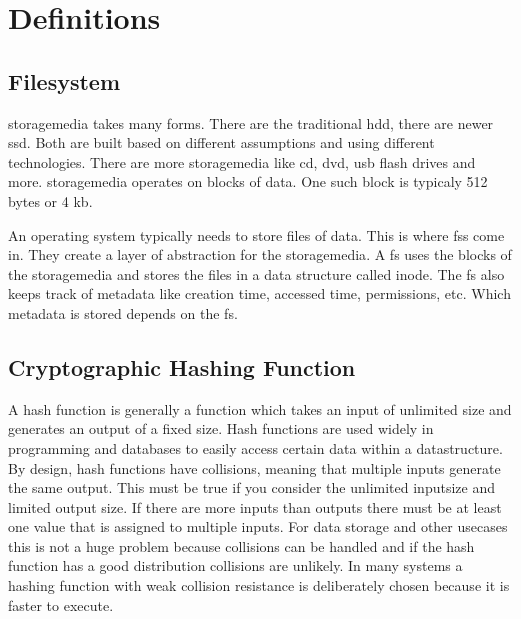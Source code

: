 \documentclass[
	a4paper,					%
	10pt,							%
	twoside,					%
	openright,				%
	notitlepage,			%
	parskip=half,			%
]{scrreprt}					%
\begin{document}
\section{Definitions}

\subsection{Filesystem}
\label{sec:fs}

\gls{storagemedia} takes many forms. There are the traditional \gls{hdd}, there are newer \gls{ssd}. Both are built based on different assumptions and using different technologies. There are more \gls{storagemedia} like \gls{cd}, \gls{dvd}, \gls{usb} flash drives and more. \gls{storagemedia} operates on blocks of data. One such block is typicaly 512 bytes or 4 \gls{kb}. \cite{bruce:imaging}

An operating system typically needs to store files of data. This is where \glspl{fs} come in. They create a layer of abstraction for the \gls{storagemedia}. A \gls{fs} uses the blocks of the \gls{storagemedia} and stores the files in a data structure called inode. \cite{inode} The \gls{fs} also keeps track of \gls{metadata} like creation time, accessed time, permissions, etc. Which \gls{metadata} is stored depends on the \gls{fs}. \cite{bruce:imaging}

\subsection{Cryptographic Hashing Function}
\label{sec:hashing}

A hash function is generally a function which takes an input of unlimited size and generates an output of a fixed size. Hash functions are used widely in programming and databases to easily access certain data within a datastructure. By design, hash functions have collisions, meaning that multiple inputs generate the same output. This must be true if you consider the unlimited inputsize and limited output size. If there are more inputs than outputs there must be at least one value that is assigned to multiple inputs. For data storage and other usecases this is not a huge problem because collisions can be handled and if the hash function has a good distribution collisions are unlikely. In many systems a hashing function with weak collision resistance is deliberately chosen because it is faster to execute. \cite{hash:noncrypto, hash:slow}
\end{document}
